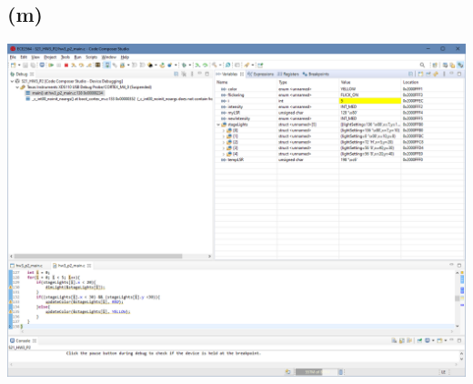 \documentclass{article}
\begin{document}
\subsection*{(m)}
\begin{center}
    \includegraphics[width = \textwidth]{m.png}
\end{center}
\end{document}
